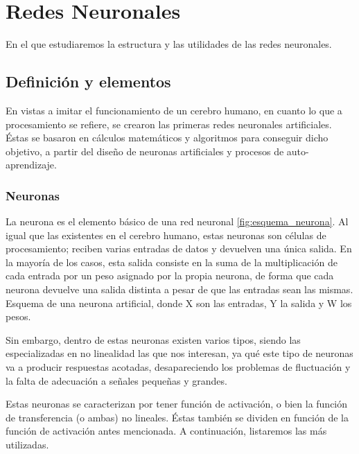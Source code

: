 \chapter{Redes Neuronales}
\label{cap:neuralnetworks}

En el que estudiaremos la estructura y las utilidades de las redes neuronales. 


\section{Definición y elementos}
En vistas a imitar el funcionamiento de un cerebro humano, en cuanto lo que a procesamiento se refiere, se crearon las primeras redes neuronales artificiales. Éstas se basaron en cálculos matemáticos y algoritmos para conseguir dicho objetivo, a partir del diseño de neuronas artificiales y procesos de auto-aprendizaje.

\subsection{Neuronas}
La neurona es el elemento básico de una red neuronal \ref{fig:esquema_neurona}. Al igual que las existentes en el cerebro humano, estas neuronas son células de procesamiento; reciben varias entradas de datos y devuelven una única salida. En la mayoría de los casos, esta salida consiste en la suma de la multiplicación de cada entrada por un peso asignado por la propia neurona, de forma que cada neurona devuelve una salida distinta a pesar de que las entradas sean las mismas. \\

%
        {Esquema de una neurona artificial, donde X son las entradas, Y la salida y W los pesos.}

Sin embargo, dentro de estas neuronas existen varios tipos, siendo las especializadas en no linealidad las que nos interesan, ya qué este tipo de neuronas va a producir respuestas acotadas, desapareciendo los problemas de fluctuación y la falta de adecuación a señales pequeñas y grandes. 

Estas neuronas se caracterizan por tener función de activación, o bien la función de transferencia (o ambas) no lineales. Éstas también se dividen en función de la función de activación antes mencionada. A continuación, listaremos las más utilizadas.

